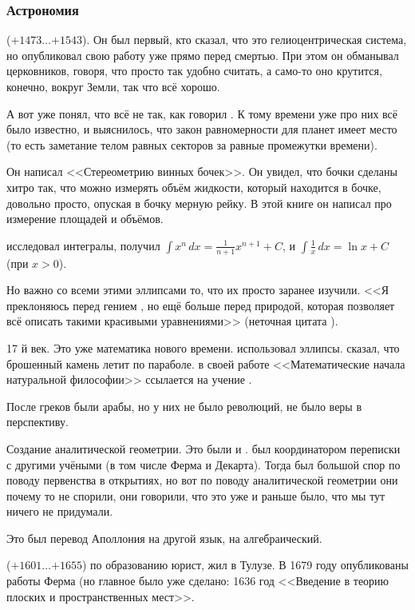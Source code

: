 \documentclass[a4paper,oneside,fleqn,10pt]{article}
\newcommand{\pe}[2]{${#1}\ldots{#2}$}
\begin{document}
\subsubsection{Астрономия}

 (\pe{+1473}{+1543}). Он был первый, кто сказал, что это гелиоцентрическая система,
но опубликовал свою работу уже прямо перед смертью.
При этом он обманывал церковников, говоря, что просто так удобно считать,
а само-то оно крутится, конечно, вокруг Земли, так что всё хорошо.

А вот  уже понял, что всё не так, как говорил .
К тому времени уже про них всё было известно, и выяснилось, что закон равномерности
для планет имеет место (то есть заметание телом равных секторов за равные
промежутки времени).

Он написал <<Стереометрию винных бочек>>. Он увидел, что бочки сделаны хитро так,
что можно измерять объём жидкости, который находится в бочке, довольно просто, опуская в бочку мерную рейку.
В этой книге он написал про измерение площадей и объёмов.

 исследовал интегралы, получил $\int x^n\,dx = \frac{1}{n+1} x^{n+1} + C$,
и $ \int \frac1x\,dx = \ln x + C$ (при $x > 0$).

Но важно со всеми этими эллипсами то, что их просто заранее изучили.
<<Я преклоняюсь перед гением , но ещё больше перед природой,
которая позволяет всё описать такими красивыми уравнениями>> (неточная цитата ).

17 й век. Это уже математика нового времени.  использовал эллипсы. 
сказал, что брошенный камень летит по параболе.  в своей работе
<<Математические начала натуральной философии>>
ссылается на учение .

После греков были арабы, но у них не было революций, не было веры в перспективу.

Создание аналитической геометрии. Это были  и .
 был координатором переписки с другими учёными (в том числе Ферма и Декарта).
Тогда был большой спор по поводу первенства в открытиях, но вот по поводу
аналитической геометрии они почему то не спорили, они говорили, что это уже и раньше было,
что мы тут ничего не придумали.

Это был перевод Аполлония на другой язык, на алгебраический.

 (\pe{+1601}{+1655}) по образованию юрист, жил в Тулузе.
В 1679 году опубликованы работы Ферма (но главное было уже сделано:
1636 год <<Введение в теорию плоских и пространственных мест>>.
\end{document}
